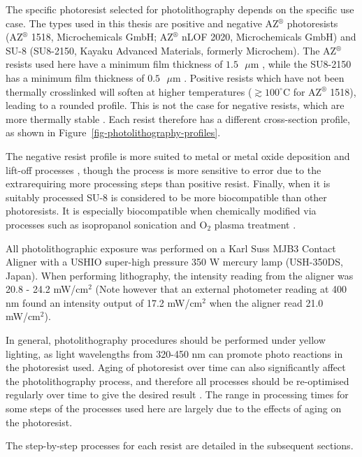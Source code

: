 \documentclass[
  a4paper,
]{scrbook}
\begin{document}
The specific photoresist selected for photolithography depends on the
specific use case. The types used in this thesis are positive and
negative AZ\(^\circledR\) photoresists (AZ\(^\circledR\) 1518,
Microchemicals GmbH; AZ\(^\circledR\) nLOF 2020, Microchemicals GmbH)
and SU-8 (SU8-2150, Kayaku Advanced Materials, formerly Microchem). The
AZ\(^\circledR\) resists used here have a minimum film thickness of
\(1.5\textrm{ } \mu \textrm{m}\) \autocite{Microchemicals}, while the
SU8-2150 has a minimum film thickness of
\(0.5\textrm{ } \mu \textrm{m}\) \autocite{Kayaku}. Positive resists
which have not been thermally crosslinked will soften at higher
temperatures (\(\gtrsim 100^\circ\)C for AZ\(^\circledR\) 1518), leading
to a rounded profile. This is not the case for negative resists, which
are more thermally stable \autocite{Microchemicals}. Each resist
therefore has a different cross-section profile, as shown in
Figure~\ref{fig-photolithography-profiles}.

The negative resist profile is more suited to metal or metal oxide
deposition and lift-off processes \autocite{Microchemicals}, though the
process is more sensitive to error due to the extrarequiring more
processing steps than positive resist. Finally, when it is suitably
processed SU-8 is considered to be more biocompatible than other
photoresists. It is especially biocompatible when chemically modified
via processes such as isopropanol sonication and O\(_2\) plasma
treatment \autocite{Chen2021}.

All photolithographic exposure was performed on a Karl Suss MJB3 Contact
Aligner with a USHIO super-high pressure 350 W mercury lamp (USH-350DS,
Japan). When performing lithography, the intensity reading from the
aligner was 20.8 - 24.2 mW/cm\(^2\) (Note however that an external
photometer reading at 400 nm found an intensity output of 17.2
mW/cm\(^2\) when the aligner read 21.0 mW/cm\(^2\)).

In general, photolithography procedures should be performed under yellow
lighting, as light wavelengths from 320-450 nm can promote photo
reactions in the photoresist used. Aging of photoresist over time can
also significantly affect the photolithography process, and therefore
all processes should be re-optimised regularly over time to give the
desired result \autocite{Microchemicals}. The range in processing times
for some steps of the processes used here are largely due to the effects
of aging on the photoresist.

The step-by-step processes for each resist are detailed in the
subsequent sections.
\end{document}
